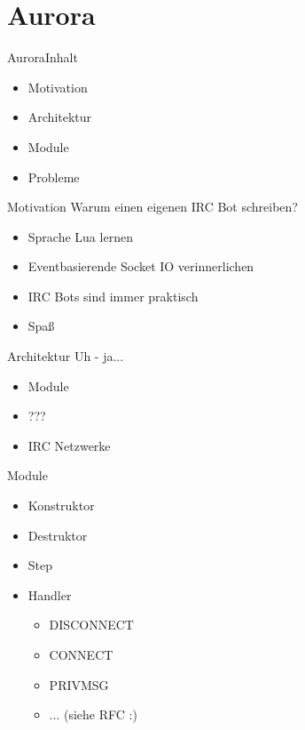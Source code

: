 \documentclass{beamer}
\begin{document}
	\section{Aurora}
		\begin{frame}{Aurora}{Inhalt}
			\begin{itemize}
				\item Motivation
				\item Architektur
				\item Module
				\item Probleme
			\end{itemize}
		\end{frame}

		\begin{frame}{Motivation}
			Warum einen eigenen IRC Bot schreiben?

			\begin{itemize}
				\item Sprache Lua lernen
				\item Eventbasierende Socket IO verinnerlichen
				\item IRC Bots sind immer praktisch
				\pause
				\item Spaß
			\end{itemize}
		\end{frame}

		\begin{frame}{Architektur}
			Uh - ja...
			\begin{itemize}
				\item Module
				\item ???
				\item IRC Netzwerke
			\end{itemize}
		\end{frame}

		\begin{frame}{Module}
			\begin{itemize}
				\item Konstruktor
				\item Destruktor
				\item Step
				\item Handler
					\begin{itemize}
						\item DISCONNECT
						\item CONNECT
						\item PRIVMSG
						\item ... (siehe RFC :)
					\end{itemize}
			\end{itemize}
		\end{frame}
		
\end{document}
